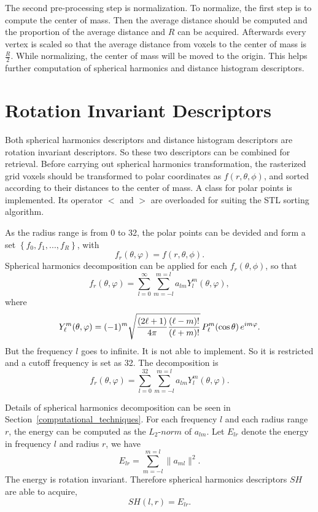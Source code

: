 The second pre-processing step is normalization. To normalize, the first step is to compute the center of mass. Then the average distance should be computed and the proportion of the average distance and $R$ can be acquired. Afterwards every vertex is scaled so that the average distance from voxels to the center of mass is $ \frac{R}{2}$. While normalizing, the center of mass will be moved to the origin. This helps further computation of spherical harmonics and distance histogram descriptors.

\section{Rotation Invariant Descriptors}

Both spherical harmonics descriptors and distance histogram descriptors are rotation invariant descriptors. So these two descriptors can be combined for retrieval. Before carrying out spherical harmonics transformation, the rasterized grid voxels should be transformed to polar coordinates as $f(r,\theta,\phi)$, and sorted according to their distances to the center of mass. A class for polar points is implemented. Its operator $<$ and $>$ are overloaded for suiting the STL sorting algorithm. 

As the radius range is from 0 to 32, the polar points can be devided and form a set ${\left\{ f_0,f_1,...,f_R \right\}}$, with 
\begin{equation}
f_r(\theta,\varphi)=f(r,\theta,\phi).
\end{equation}
Spherical harmonics decomposition can be applied for each $f_r(\theta,\phi)$, so that
\begin{equation}
f_r(\theta,\varphi)=\sum_{l=0}^{\infty}\sum_{m=-l}^{m=l}a_{lm}Y_{l}^{m}(\theta,\varphi),
\end{equation}
where
\begin{equation}
Y_\ell^m( \theta , \varphi ) = (-1)^m \sqrt{{(2\ell+1)\over 4\pi}{(\ell-m)!\over (\ell+m)!}} \, P_\ell^m ( \cos{\theta} ) \, e^{i m \varphi }.
\end{equation}
But the frequency $l$ goes to infinite. It is not able to implement. So it is restricted and a cutoff frequency is set as 32. The decomposition is 
\begin{equation}
f_r(\theta,\varphi)=\sum_{l=0}^{32}\sum_{m=-l}^{m=l}a_{lm}Y_{l}^{m}(\theta,\varphi).
\end{equation}

Details of spherical harmonics decomposition can be seen in Section~\ref{computational_techniques}. For each frequency $l$ and each radius range $r$, the energy can be computed as the $L_{2}$-$norm$ of $a_{lm}$. Let $E_{lr}$ denote the energy in frequency $l$ and radius $r$, we have
\begin{equation}
E_{lr}=\sum_{m=-l}^{m=l}\|a_{ml}\|^{2}.
\end{equation}
The energy is rotation invariant. Therefore spherical harmonics descriptors $SH$ are able to acquire,
\begin{equation}
SH(l,r) = E_{lr}.
\end{equation}

